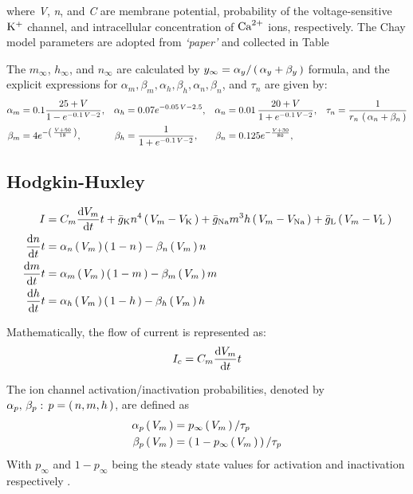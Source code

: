 \documentclass[../../Orator.tex]{subfiles}
\begin{document}
where \textit{V}, \textit{n}, and \textit{C} are membrane potential, probability of the voltage-sensitive \(\mathrm{K}^+\) channel, and intracellular concentration of \(\mathrm{Ca}^{2+}\) ions, respectively. The Chay model parameters are adopted from \textit{`paper'} and collected in Table

The \(m_\infty\), \(h_\infty\), and \(n_\infty\) are calculated by \(y_\infty = \alpha_y / \br{\alpha_y + \beta_y} \) formula, and the explicit expressions for 
\(\alpha_m, \beta_m, \alpha_h, \beta_h, \alpha_n, \beta_n\), and \(\tau_n\) are given by:
\begin{align*}
    \alpha_m &= 0.1 \frac{ 25 + V }{1 - e^{-0.1 \, V - 2}}, &
    \alpha_h &=  0.07 e^{-0.05\,V -2.5}, &
    \alpha_n &= 0.01 \, \frac{ 20 + V }{ 1 + e^{-0.1 \, V - 2}}, &
    \tau_n &= \frac{1}{ r_n \, \br{\alpha_n + \beta_n} } \\
    \beta_m  &= 4 e^{-\br{\frac{ V + 50 }{ 18 } } }, &
    \beta_h  &= \frac{ 1 }{ 1 + e^{-0.1 \, V - 2}}, &
    \beta_n  &= 0.125 e^{- \frac{V + 30}{80}}, &
\end{align*}




\subsection{Hodgkin-Huxley}
\begin{subequations}\label{eq:HodHuxSys}
    \begin{align}
        I &= C_m \ode{V_m}{t} + \bar{g}_\rmm{K} n^4 \br{V_m - V_\rmm{K}} + \bar{g}_\rmm{Na} m^3 h \br{V_m - V_\rmm{Na}}  + \bar{g}_\rmm{L} \br{V_m - V_\rmm{L}} \\
        \ode{n}{t} &= \alpha_n \br{V_m} \br{1-n} - \beta_n \br{V_m} n \\
        \ode{m}{t} &= \alpha_m \br{V_m} \br{1-m} - \beta_m \br{V_m} m \\
        \ode{h}{t} &= \alpha_h \br{V_m} \br{1-h} - \beta_h \br{V_m} h 
    \end{align}
\end{subequations}

Mathematically, the flow of current is represented as:
\begin{equation}
    I_c = C_m \ode{V_m}{t}
\end{equation}



The ion channel activation/inactivation probabilities, denoted by \(\alpha_p, \, \beta_p : \, p=\br{n,m,h}\), are defined as 
\begin{align}
    \alpha_p\br{V_m} &= p_\infty \br{V_m} / \tau_p \\
    \beta_p\br{V_m}  &= \br{1 - p_\infty \br{V_m}} / \tau_p 
\end{align}
With \(p_\infty\) and \(1-p_\infty\) being the steady state values for activation and inactivation respectively \cite{}. 
\end{document}
